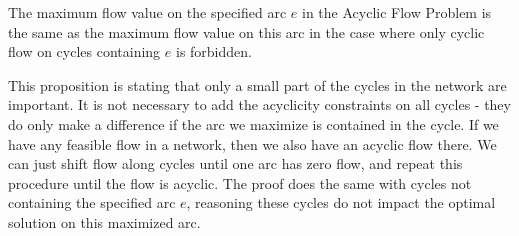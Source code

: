 \begin{prop}
  The maximum flow value on the specified arc $e$ in the Acyclic Flow Problem is the same as the 
  maximum flow value on this arc in the case where only cyclic flow on cycles containing $e$ is forbidden. 
\end{prop}
This proposition is stating that only a small part of the cycles in the network are important. It is not necessary 
to add the acyclicity constraints on all cycles - they do only make a difference if the arc we maximize is contained in 
the cycle. If we have any feasible flow in a network, then we also have an acyclic flow there. We can just shift flow 
along cycles until one arc has zero flow, and repeat this procedure until the flow is acyclic. The proof does the same 
with cycles not containing the specified arc $e$, reasoning these cycles do not impact the optimal solution on this
maximized arc.
